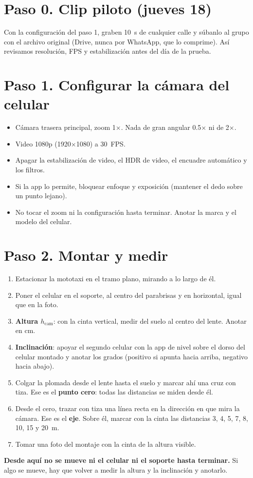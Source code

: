 \documentclass[10pt,a4paper]{article}
\begin{document}
\section*{Paso 0. Clip piloto (jueves 18)}
Con la configuración del paso 1, graben 10~s de cualquier calle y súbanlo al grupo con el archivo original
(Drive, nunca por WhatsApp, que lo comprime). Así revisamos resolución, FPS y estabilización antes del día de la
prueba.

\section*{Paso 1. Configurar la cámara del celular}
\begin{itemize}
  \item Cámara trasera principal, zoom 1$\times$. Nada de gran angular 0.5$\times$ ni de 2$\times$.
  \item Video 1080p (1920$\times$1080) a 30~FPS.
  \item Apagar la estabilización de video, el HDR de video, el encuadre automático y los filtros.
  \item Si la app lo permite, bloquear enfoque y exposición (mantener el dedo sobre un punto lejano).
  \item No tocar el zoom ni la configuración hasta terminar. Anotar la marca y el modelo del celular.
\end{itemize}

\section*{Paso 2. Montar y medir}
\begin{enumerate}
  \item Estacionar la mototaxi en el tramo plano, mirando a lo largo de él.
  \item Poner el celular en el soporte, al centro del parabrisas y en horizontal, igual que en la foto.
  \item \textbf{Altura $h_\mathrm{cam}$}: con la cinta vertical, medir del suelo al centro del lente. Anotar en cm.
  \item \textbf{Inclinación}: apoyar el segundo celular con la app de nivel sobre el dorso del celular montado y
        anotar los grados (positivo si apunta hacia arriba, negativo hacia abajo).
  \item Colgar la plomada desde el lente hasta el suelo y marcar ahí una cruz con tiza. Ese es el
        \textbf{punto cero}: todas las distancias se miden desde él.
  \item Desde el cero, trazar con tiza una línea recta en la dirección en que mira la cámara. Ese es el
        \textbf{eje}. Sobre él, marcar con la cinta las distancias 3, 4, 5, 7, 8, 10, 15 y 20~m.
  \item Tomar una foto del montaje con la cinta de la altura visible.
\end{enumerate}
\textcolor{red!70!black}{\textbf{Desde aquí no se mueve ni el celular ni el soporte hasta terminar.}} Si algo se
mueve, hay que volver a medir la altura y la inclinación y anotarlo.
\end{document}
